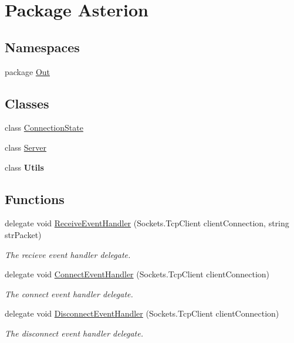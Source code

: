 \hypertarget{namespaceAsterion}{\section{Package Asterion}
\label{namespaceAsterion}
}
\subsection*{Namespaces}
\begin{DoxyCompactItemize}
\item 
package \hyperlink{namespaceAsterion_1_1Out}{Out}
\end{DoxyCompactItemize}
\subsection*{Classes}
\begin{DoxyCompactItemize}
\item 
class \hyperlink{classAsterion_1_1ConnectionState}{Connection\-State}
\item 
class \hyperlink{classAsterion_1_1Server}{Server}
\item 
class {\bfseries Utils}
\end{DoxyCompactItemize}
\subsection*{Functions}
\begin{DoxyCompactItemize}
\item 
\hypertarget{namespaceAsterion_a8df76ce0b97fca73a25888bd3b8cf7df}{delegate void \hyperlink{namespaceAsterion_a8df76ce0b97fca73a25888bd3b8cf7df}{Receive\-Event\-Handler} (Sockets.\-Tcp\-Client client\-Connection, string str\-Packet)}\label{namespaceAsterion_a8df76ce0b97fca73a25888bd3b8cf7df}

\begin{DoxyCompactList}\small\item\em The recieve event handler delegate. \end{DoxyCompactList}\item 
\hypertarget{namespaceAsterion_a2a28db7d2f05f0681f449c943b3ae7bc}{delegate void \hyperlink{namespaceAsterion_a2a28db7d2f05f0681f449c943b3ae7bc}{Connect\-Event\-Handler} (Sockets.\-Tcp\-Client client\-Connection)}\label{namespaceAsterion_a2a28db7d2f05f0681f449c943b3ae7bc}

\begin{DoxyCompactList}\small\item\em The connect event handler delegate. \end{DoxyCompactList}\item 
\hypertarget{namespaceAsterion_abd656f1ebffed3a17a1a0f809979f363}{delegate void \hyperlink{namespaceAsterion_abd656f1ebffed3a17a1a0f809979f363}{Disconnect\-Event\-Handler} (Sockets.\-Tcp\-Client client\-Connection)}\label{namespaceAsterion_abd656f1ebffed3a17a1a0f809979f363}

\begin{DoxyCompactList}\small\item\em The disconnect event handler delegate. \end{DoxyCompactList}\end{DoxyCompactItemize}


